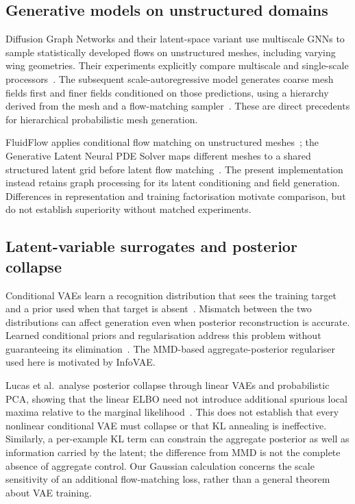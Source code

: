 \subsection{Generative models on unstructured domains}
\label{sec:related:offgrid}

Diffusion Graph Networks and their latent-space variant use multiscale GNNs
to sample statistically developed flows on unstructured meshes, including
varying wing geometries. Their experiments explicitly compare multiscale and
single-scale processors~\cite{lino2025diffusiongraphnets}. The subsequent
scale-autoregressive model generates coarse mesh fields first and finer fields
conditioned on those predictions, using a hierarchy derived from the mesh
and a flow-matching sampler~\cite{lino2026scaleautoregressive}. These are
direct precedents for hierarchical probabilistic mesh generation.

FluidFlow applies conditional flow matching on unstructured
meshes~\cite{ramos2026fluidflow}; the Generative Latent Neural PDE Solver maps
different meshes to a shared structured latent grid before latent flow
matching~\cite{li2025genlatentfm}. The present implementation instead
retains graph processing for its latent conditioning and field generation.
Differences in representation and training factorisation motivate comparison,
but do not establish superiority without matched experiments.

\subsection{Latent-variable surrogates and posterior collapse}
\label{sec:related:vae}

Conditional VAEs learn a recognition distribution that sees the training
target and a prior used when that target is absent~\cite{sohn2015cvae}.
Mismatch between the two distributions can affect generation even when
posterior reconstruction is accurate. Learned conditional priors and
regularisation address this problem without guaranteeing its
elimination~\cite{denton2018svglp,zhao2017infovae}. The MMD-based
aggregate-posterior regulariser used here is motivated by InfoVAE.

Lucas et al.\ analyse posterior collapse through linear VAEs and probabilistic
PCA, showing that the linear ELBO need not introduce additional spurious local
maxima relative to the marginal likelihood~\cite{lucas2019dontblame}. This
does not establish that every nonlinear conditional VAE must collapse or that
KL annealing is ineffective. Similarly, a per-example KL term can constrain
the aggregate posterior as well as information carried by the latent; the
difference from MMD is not the complete absence of aggregate control.
Our Gaussian calculation concerns the scale sensitivity of an additional
flow-matching loss, rather than a general theorem about VAE training.

